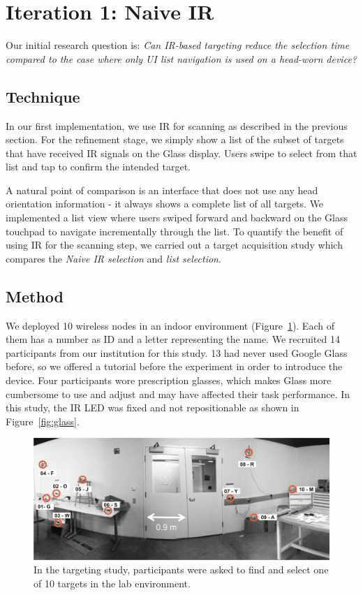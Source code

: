 
\section{Iteration 1: Naive IR}
Our initial research question is: {\em Can IR-based targeting reduce the selection time compared to the case where only UI list navigation is used on a head-worn device?} 

\subsection{Technique}
In our first implementation, we use IR for scanning as described in the previous section. For the refinement stage, we simply show a list of the subset of targets that have received IR signals on the Glass display. Users swipe to select from that list and tap to confirm the intended target.

A natural point of comparison is an interface that does not use any head orientation information - it always shows a complete list of all targets. We implemented a list view where users swiped forward and backward on the Glass touchpad to navigate incrementally through the list. To quantify the benefit of using IR for the scanning step, we carried out a target acquisition study which compares the {\em Naive IR selection} and {\em list selection}.  

\subsection{Method}
We deployed 10 wireless nodes in an indoor environment (Figure~\ref{fig:targeting-study-layout}). Each of them has a number as ID and a letter representing the name. We recruited 14 participants from our institution  for this study. 13 had never used Google Glass before, so we offered a tutorial before the experiment in order to introduce the device. Four participants wore prescription glasses, which makes Glass more cumbersome to use and adjust and may have affected their task performance. In this study, the IR LED was fixed and not repositionable as shown in Figure~\ref{fig:glass}.

\begin{figure}[t]
\centering
\includegraphics[width=0.9\columnwidth]{figures/study-layout1.png}
\caption{In the targeting study, participants were asked to find and select one of 10 targets in the lab environment.}
\label{fig:targeting-study-layout}
\end{figure}

